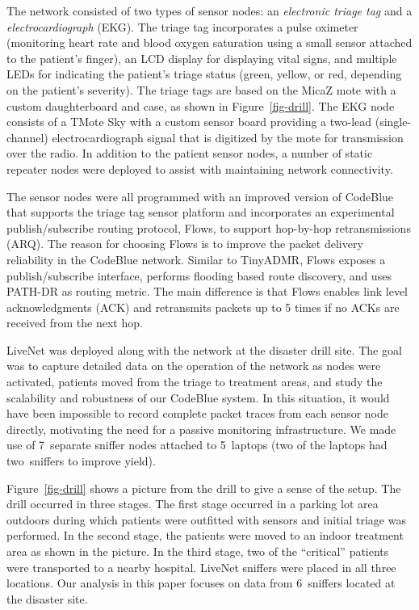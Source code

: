 The network consisted of two types of sensor nodes: an
{\em electronic triage tag} and a {\em electrocardiograph} (EKG).
The triage tag incorporates a pulse oximeter
(monitoring heart rate and blood oxygen saturation using a small
sensor attached to the patient's finger), an LCD display for
displaying vital signs, and multiple LEDs for indicating the patient's 
triage status (green, yellow, or red, depending on the patient's severity). 
The triage tags are based on the MicaZ mote with a custom 
daughterboard and case, as shown in Figure~\ref{fig-drill}. The EKG
node consists of a TMote Sky with a custom sensor board
providing a two-lead (single-channel) electrocardiograph signal that
is digitized by the mote for transmission over the radio. 
In addition to the patient sensor nodes, a number of static repeater
nodes were deployed to assist with maintaining network connectivity.

The sensor nodes were all programmed with an improved version of CodeBlue that supports the
triage tag sensor platform and incorporates an experimental publish/subscribe 
routing protocol, Flows, to support hop-by-hop retransmissions (ARQ). 
The reason for choosing Flows is to improve the packet delivery reliability 
in the CodeBlue network. Similar to TinyADMR, Flows exposes a publish/subscribe
interface, performs flooding based route discovery, and uses PATH-DR as
routing metric. The main difference is that Flows enables link level
acknowledgments (ACK) and retransmits packets up to 5 times if no ACKs are
received from the next hop.


LiveNet was deployed along with the network at the disaster drill site. The
goal was to capture detailed data on the
operation of the network as nodes were activated, patients moved from
the triage to treatment areas, and study the scalability and
robustness of our CodeBlue system. In this
situation, it would have been impossible to record complete packet
traces from each sensor node directly, motivating the need for a
passive monitoring infrastructure. We made use of 7~separate sniffer
nodes attached to 5~laptops (two of the laptops had two~sniffers to
improve yield). 

Figure~\ref{fig-drill} shows a picture from the drill to give a sense
of the setup. The drill occurred in three stages. The first stage
occurred in a parking lot area outdoors during which patients were
outfitted with sensors and initial triage was performed. In the second
stage, the patients were moved to an indoor treatment area
as shown in the picture. In the third stage, two of the ``critical''
patients were transported to a nearby hospital. LiveNet sniffers were
placed in all three locations. Our analysis in this paper focuses on
data from 6~sniffers located at the disaster site.

